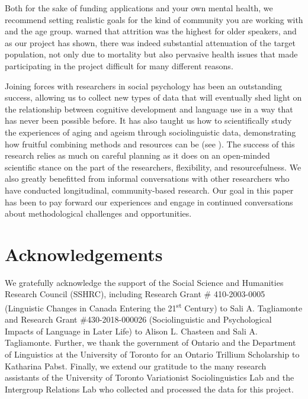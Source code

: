 \documentclass[output=paper]{langscibook}
\begin{document}
Both for the sake of funding applications and your own mental health, we recommend setting realistic goals for the kind of community you are working with and the age group. \citet{Sankoff2017} warned that attrition was the highest for older speakers, and as our project has shown, there was indeed substantial attenuation of the target population, not only due to mortality but also pervasive health issues that made participating in the project difficult for many different reasons.



Joining forces with researchers in social psychology has been an outstanding success, allowing us to collect new types of data that will eventually shed light on the relationship between cognitive development and language use in a way that has never been possible before. It has also taught us how to scientifically study the experiences of aging and ageism through sociolinguistic data, demonstrating how fruitful combining methods and resources can be (see \citealt{ChasteenEtAl2022}). The success of this research relies as much on careful planning as it does on an open-minded scientific stance on the part of the researchers, flexibility, and resourcefulness. We also greatly benefitted from informal conversations with other researchers who have conducted longitudinal, community-based research. Our goal in this paper has been to pay forward our experiences and engage in continued conversations about methodological challenges and opportunities.


\section*{Acknowledgements}

We gratefully acknowledge the support of the Social Science and Humanities Research Council (SSHRC), including Research Grant \# 410-2003-0005 (Linguistic Changes in Canada Entering the 21\textsuperscript{st} Century) to Sali A. Tagliamonte and Research Grant \#430-2018-000026 (Sociolinguistic and Psychological Impacts of Language in Later Life) to Alison L. Chasteen and Sali A. Tagliamonte. Further, we thank the government of Ontario and the Department of Linguistics at the University of Toronto for an Ontario Trillium Scholarship to Katharina Pabst. Finally, we extend our gratitude to the many research assistants of the University of Toronto Variationist Sociolinguistics Lab and the Intergroup Relations Lab who collected and processed the data for this project.

\printbibliography[heading=subbibliography,notkeyword=this]
\end{document}
